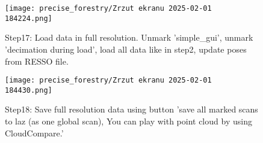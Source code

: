 \begin{figure}[H]
	\centering
	\texttt{[image: precise\_forestry/Zrzut ekranu 2025-02-01 184224.png]}
	\caption{Step17: Load data in full resolution. Unmark 'simple\_gui', unmark 'decimation during load', load all data like in step2, update poses from RESSO file.  }
	\label{fig:pf21}
\end{figure}


\begin{figure}[H]
	\centering
	\texttt{[image: precise\_forestry/Zrzut ekranu 2025-02-01 184430.png]}
	\caption{Step18: Save full resolution data using button 'save all marked scans to laz (as one global scan), You can play with point cloud by using CloudCompare.'}
	\label{fig:pf23}
\end{figure}
